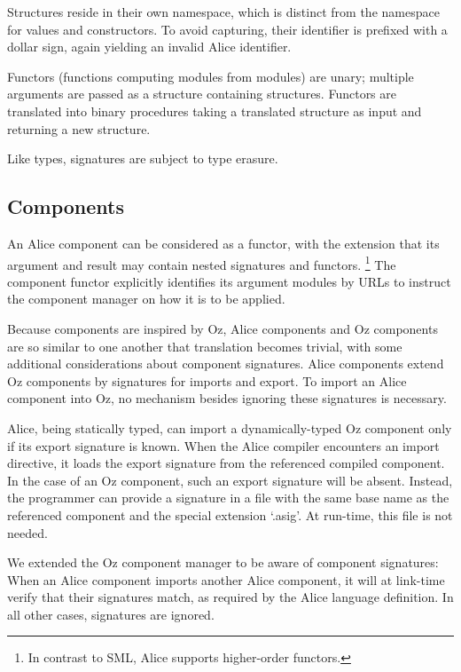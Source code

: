 \documentclass{entcs}
\begin{document}
Structures reside in their own namespace, which is distinct from the namespace
for values and constructors.  To avoid capturing, their identifier is prefixed
with a dollar sign, again yielding an invalid Alice identifier.

Functors (functions computing modules from modules) are unary; multiple
arguments are passed as a structure containing structures.  Functors are
translated into binary procedures taking a translated structure as input
and returning a new structure.

Like types, signatures are subject to type erasure.

\subsection{Components}

An Alice component can be considered as a functor, with the extension
that its argument and result may contain nested signatures and functors.%
\footnote{In contrast to SML, Alice supports higher-order functors.}
The component functor explicitly identifies its argument modules by URLs
to instruct the component manager on how it is to be applied.

Because components are inspired by Oz, Alice components and Oz components
are so similar to one another that translation becomes trivial, with some
additional considerations about component signatures.  Alice components
extend Oz components by signatures for imports and export.  To import an
Alice component into Oz, no mechanism besides ignoring these signatures is
necessary.

Alice, being statically typed, can import a dynamically-typed Oz component
only if its export signature is known.  When the Alice compiler encounters
an import directive, it loads the export signature from the referenced
compiled component.  In the case of an Oz component, such an export signature
will be absent.  Instead, the programmer can provide a signature in a file
with the same base name as the referenced component and the special extension
`.asig'.  At run-time, this file is not needed.

We extended the Oz component manager to be aware of component signatures:
When an Alice component imports another Alice component, it will at link-time
verify that their signatures match, as required by the Alice language
definition.  In all other cases, signatures are ignored.
\end{document}
